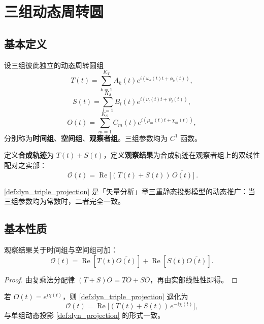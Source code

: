 \section{三组动态周转圆}
\label{sec:dyn_triple}

\subsection{基本定义}

\begin{definition}[三组动态周转圆]\label{def:dyn_triple_groups}
设三组彼此独立的动态周转圆组
\[
T(t)=\sum_{k=1}^{K_T}A_k(t)e^{i(\omega_k(t)t+\phi_k(t))},
\]
\[
S(t)=\sum_{l=1}^{K_S}B_l(t)e^{i(\nu_l(t)t+\psi_l(t))},
\]
\[
O(t)=\sum_{m=1}^{K_O}C_m(t)e^{i(\mu_m(t)t+\chi_m(t))},
\]
分别称为\textbf{时间组}、\textbf{空间组}、\textbf{观察者组}。三组参数均为 $C^1$ 函数。
\end{definition}

\begin{definition}[合成—投影观察结果]\label{def:dyn_triple_projection}
定义\textbf{合成轨迹}为 $T(t)+S(t)$，定义\textbf{观察结果}为合成轨迹在观察者组上的双线性配对之实部：
\[
\boxed{\ \mathcal O(t)=\operatorname{Re}\!\big[(T(t)+S(t))\,\overline{O(t)}\big]\ }.
\]
\end{definition}

\begin{remark}\label{rem:dyn_triple_static_relation}
\cref{def:dyn_triple_projection} 是「矢量分析」章三重静态投影模型的动态推广：当三组参数均为常数时，二者完全一致。
\end{remark}

\subsection{基本性质}

\begin{proposition}[合成—投影的可加性]\label{prop:dyn_triple_additivity}
观察结果关于时间组与空间组可加：
\[
\mathcal O(t)=\operatorname{Re}[T(t)\overline{O(t)}]+\operatorname{Re}[S(t)\overline{O(t)}].
\]
\end{proposition}

\begin{proof}
由复乘法分配律 $(T+S)\overline O=T\overline O+S\overline O$，再由实部线性性即得。
\end{proof}

\begin{proposition}[单位模观察者的退化]\label{prop:dyn_triple_unimodular}
若 $O(t)=e^{i\chi(t)}$，则 \cref{def:dyn_triple_projection} 退化为
\[
\mathcal O(t)=\operatorname{Re}\!\big[(T(t)+S(t))\,e^{-i\chi(t)}\big],
\]
与单组动态投影 \cref{def:dyn_projection} 的形式一致。
\end{proposition}

